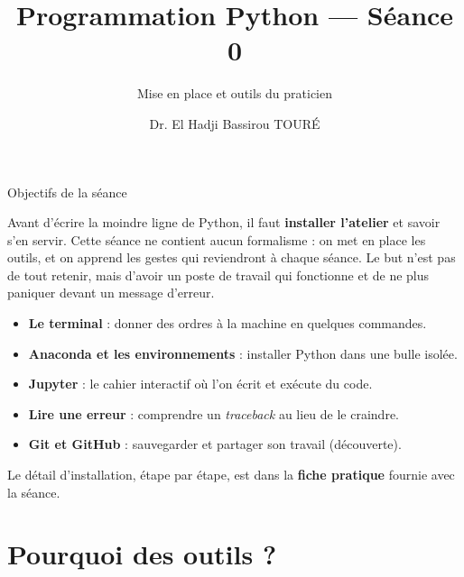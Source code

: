 \documentclass[aspectratio=169,11pt]{beamer}
\title{Programmation Python — Séance 0}
\subtitle{Mise en place et outils du praticien}
\author{Dr. El Hadji Bassirou TOURÉ}
\institute{Département de Mathématiques et Informatique\\ Faculté des Sciences et Techniques\\ Université Cheikh Anta Diop de Dakar}
\date{}
\begin{document}
\begin{frame}\titlepage\end{frame}

\begin{frame}{Objectifs de la séance}
\begin{ucaddef}[Contenu]
{\small Avant d'écrire la moindre ligne de Python, il faut \textbf{installer l'atelier} et savoir s'en servir. Cette séance ne contient aucun formalisme : on met en place les outils, et on apprend les gestes qui reviendront à chaque séance. Le but n'est pas de tout retenir, mais d'avoir un poste de travail qui fonctionne et de ne plus paniquer devant un message d'erreur.}
\end{ucaddef}
\begin{itemize}\small
  \item \textbf{Le terminal} : donner des ordres à la machine en quelques commandes.
  \item \textbf{Anaconda et les environnements} : installer Python dans une bulle isolée.
  \item \textbf{Jupyter} : le cahier interactif où l'on écrit et exécute du code.
  \item \textbf{Lire une erreur} : comprendre un \emph{traceback} au lieu de le craindre.
  \item \textbf{Git et GitHub} : sauvegarder et partager son travail (découverte).
\end{itemize}
{\small Le détail d'installation, étape par étape, est dans la \textbf{fiche pratique} fournie avec la séance.}
\end{frame}

\section{Pourquoi des outils ?}
\end{document}
